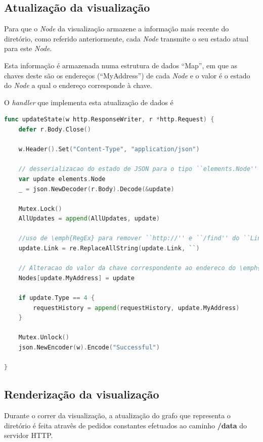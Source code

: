 \subsection{Atualização da visualização}
Para que o \emph{Node} da visualização armazene a informação mais recente do diretório, como referido anteriormente,
cada \emph{Node} transmite o seu estado atual para este \emph{Node}.

Esta informação é armazenada numa estrutura de dados ``Map'', em que as chaves deste são os endereços (``MyAddress'') de cada 
\emph{Node} e o valor é o estado do \emph{Node} a qual o endereço corresponde à chave.

O \emph{handler} que implementa esta atualização de dados é 

\begin{lstlisting}[caption={\emph{Handler} ``myChanRoute'' do método ``/myChan''},language=Go]
	func updateState(w http.ResponseWriter, r *http.Request) {
	defer r.Body.Close()

	w.Header().Set("Content-Type", "application/json")

	// desserializacao do estado de JSON para o tipo ``elements.Node''
	var update elements.Node
	_ = json.NewDecoder(r.Body).Decode(&update)

	Mutex.Lock()
	AllUpdates = append(AllUpdates, update)

	//uso de \emph{RegEx} para remover ``http://'' e ``/find'' do ``Link'' da atualizacao
	update.Link = re.ReplaceAllString(update.Link, ``)

	// Alteracao do valor da chave correspondente ao endereco do \emph{Node} que fez atualizacao com o seu novo estado
	Nodes[update.MyAddress] = update

	if update.Type == 4 {
		requestHistory = append(requestHistory, update.MyAddress)
	}

	Mutex.Unlock()
	json.NewEncoder(w).Encode("Successful")

}

\end{lstlisting}


\subsection{Renderização da visualização}

Durante o correr da visualização, a atualização do grafo que representa o diretório é feita atravês de 
pedidos constantes efetuados ao caminho \textbf{/data} do servidor \acs{HTTP}.

